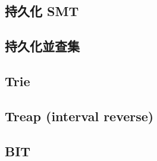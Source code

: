 \documentclass[a4paper,10pt,twocolumn,oneside]{article}
\begin{document}
\subsection{持久化 SMT}


\subsection{持久化並查集}


\subsection{Trie}


\subsection{Treap  (interval reverse)}


%

%

\subsection{BIT}


% 

%

%
\end{document}
